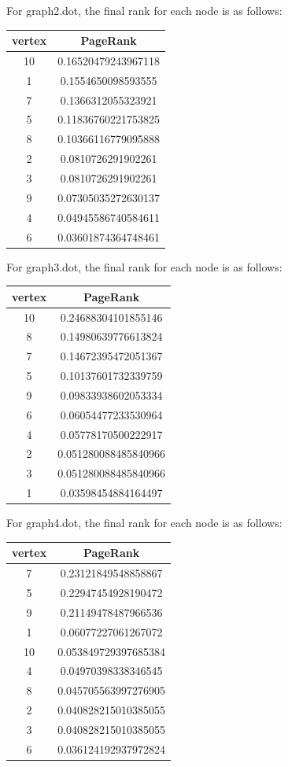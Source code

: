 \documentclass[9pt,twoside]{exam}
\begin{document}
For graph2.dot, the final rank for each node is as follows:\\
\begin{center}
\begin{tabular}{ |c|c| } 
 \hline
 vertex & PageRank  \\ 
\hline
10 & 0.16520479243967118 \\
1 & 0.1554650098593555 \\ 
7 & 0.1366312055323921\\ 
5 & 0.11836760221753825\\ 
8 & 0.10366116779095888\\ 
2 & 0.0810726291902261\\ 
3 & 0.0810726291902261\\ 
9 & 0.07305035272630137\\ 
4 & 0.04945586740584611\\ 
6 & 0.03601874364748461\\ 
 \hline
\end{tabular}
\end{center} 

For graph3.dot, the final rank for each node is as follows:\\
\begin{center}
\begin{tabular}{ |c|c| } 
 \hline
 vertex & PageRank  \\ 
\hline
10 & 0.24688304101855146\\ 
8 & 0.14980639776613824\\ 
7 & 0.14672395472051367\\ 
5 & 0.10137601732339759\\ 
9 & 0.09833938602053334\\ 
6 & 0.06054477233530964\\ 
4 & 0.05778170500222917\\ 
2 & 0.051280088485840966\\ 
3 & 0.051280088485840966\\ 
1 & 0.03598454884164497\\ 
 \hline
\end{tabular}
\end{center} 

For graph4.dot, the final rank for each node is as follows:\\
\begin{center}
\begin{tabular}{ |c|c| } 
 \hline
 vertex & PageRank  \\ 
\hline
7 & 0.23121849548858867\\ 
5 & 0.22947454928190472\\ 
9 & 0.21149478487966536\\ 
1 & 0.06077227061267072\\ 
10 & 0.053849729397685384\\ 
4 & 0.04970398338346545\\ 
8 & 0.045705563997276905\\ 
2 & 0.040828215010385055\\ 
3 & 0.040828215010385055\\ 
6 & 0.036124192937972824\\ 
 \hline
\end{tabular}
\end{center} 
\end{document}
